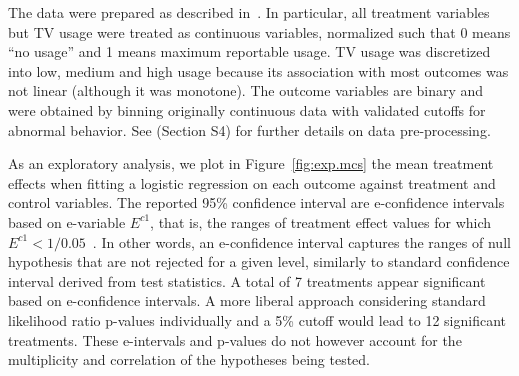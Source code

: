 \documentclass[pdflatex,sn-mathphys-num]{sn-jnl}%
\theoremstyle{thmstyleone}%
\theoremstyle{thmstyletwo}%
\theoremstyle{thmstylethree}%
\begin{document}
The data were prepared as described in~\cite{semken:2022}. In particular, all treatment variables but TV usage were treated as
continuous variables, normalized such that 0 means “no usage” and 1 means maximum
reportable usage. TV usage was discretized into low, medium and high usage because its association with most outcomes was not linear (although it was monotone). The outcome variables are binary and were obtained by binning originally continuous data with validated cutoffs for abnormal behavior. See \cite{semken:2022} (Section S4) for further details on data pre-processing.

As an exploratory analysis, we plot in Figure~\ref{fig:exp.mcs} the mean treatment effects when fitting a logistic regression on each outcome against treatment and control variables. The reported 95\% confidence interval are e-confidence intervals based on e-variable $E^{c1}$, that is, the ranges of treatment effect values for which $E^{c1}<1/0.05$~\cite{ramdas:2025}. In other words, an e-confidence interval captures the ranges of null hypothesis that are not rejected for a given level, similarly to standard confidence interval derived from test statistics. A total of 7 treatments appear significant based on e-confidence intervals. A more liberal approach considering standard likelihood ratio p-values individually and a 5\% cutoff would lead to 12 significant treatments. These e-intervals and p-values do not however account for the multiplicity and correlation of the hypotheses being tested.
\end{document}
